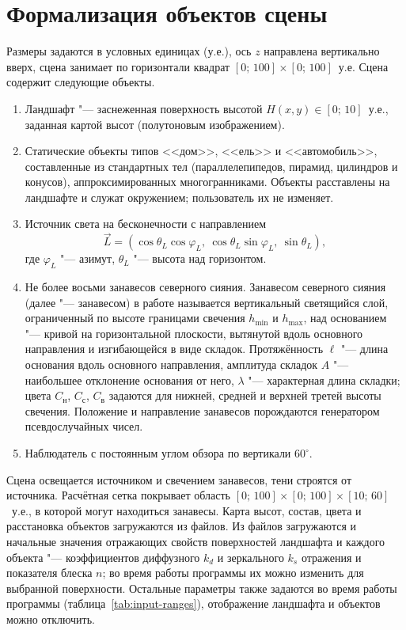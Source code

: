 \section{Формализация объектов сцены}

Размеры задаются в условных единицах (у.е.), ось $z$ направлена вертикально вверх, сцена занимает по горизонтали квадрат $[0;\,100] \times [0;\,100]$~у.е. Сцена содержит следующие объекты.
\begin{enumerate}
	\item Ландшафт "--- заснеженная поверхность высотой $H(x, y) \in [0;\,10]$~у.е., заданная картой высот (полутоновым изображением).
	\item Статические объекты типов <<дом>>, <<ель>> и <<автомобиль>>, составленные из стандартных тел (параллелепипедов, пирамид, цилиндров и конусов), аппроксимированных многогранниками. Объекты расставлены на ландшафте и служат окружением; пользователь их не изменяет.
	\item Источник света на бесконечности с направлением
	\begin{equation}
		\vec{L} = (\cos\theta_L \cos\varphi_L,\ \cos\theta_L \sin\varphi_L,\ \sin\theta_L),
		\label{eq:light-dir}
	\end{equation}
	где $\varphi_L$ "--- азимут, $\theta_L$ "--- высота над горизонтом.
	\item Не более восьми занавесов северного сияния. Занавесом северного сияния (далее "--- занавесом) в работе называется вертикальный светящийся слой, ограниченный по высоте границами свечения $h_{\min}$ и $h_{\max}$, над основанием "--- кривой на горизонтальной плоскости, вытянутой вдоль основного направления и изгибающейся в виде складок. Протяжённость $\ell$ "--- длина основания вдоль основного направления, амплитуда складок $A$ "--- наибольшее отклонение основания от него, $\lambda$ "--- характерная длина складки; цвета $C_{\text{н}}$, $C_{\text{с}}$, $C_{\text{в}}$ задаются для нижней, средней и верхней третей высоты свечения. Положение и направление занавесов порождаются генератором псевдослучайных чисел.
	\item Наблюдатель с постоянным углом обзора по вертикали $60^\circ$.
\end{enumerate}

Сцена освещается источником и свечением занавесов, тени строятся от источника. Расчётная сетка покрывает область $[0;\,100] \times [0;\,100] \times [10;\,60]$~у.е., в которой могут находиться занавесы. Карта высот, состав, цвета и расстановка объектов загружаются из файлов. Из файлов загружаются и начальные значения отражающих свойств поверхностей ландшафта и каждого объекта "--- коэффициентов диффузного $k_d$ и зеркального $k_s$ отражения и показателя блеска $n$; во время работы программы их можно изменить для выбранной поверхности. Остальные параметры также задаются во время работы программы (таблица~\ref{tab:input-ranges}), отображение ландшафта и объектов можно отключить.

